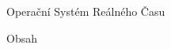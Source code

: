 \nopagenumbers

\tit Operační Systém Reálného Času
\newpage

\nonum\notoc\sec Obsah
\maketoc
\newpage

\pagenumbers
